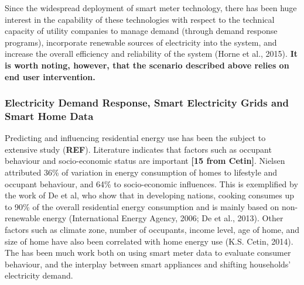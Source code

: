 \documentclass[11pt,]{article}
\begin{document}
Since the widespread deployment of smart meter technology, there has
been huge interest in the capability of these technologies with respect
to the technical capacity of utility companies to manage demand (through
demand response programs), incorporate renewable sources of electricity
into the system, and increase the overall efficiency and reliability of
the system (Horne et al., 2015). \textbf{It is worth noting, however,
that the scenario described above relies on end user intervention.}

\hypertarget{electricity-demand-response-smart-electricity-grids-and-smart-home-data}{%
\subsubsection{Electricity Demand Response, Smart Electricity Grids and
Smart Home
Data}\label{electricity-demand-response-smart-electricity-grids-and-smart-home-data}}

Predicting and influencing residential energy use has been the subject
to extensive study (\textbf{REF}). Literature indicates that factors
such as occupant behaviour and socio-economic status are important
\textbf{{[}15 from Cetin{]}}. Nielsen attributed 36\% of variation in
energy consumption of homes to lifestyle and occupant behaviour, and
64\% to socio-economic influences. This is exemplified by the work of De
et al, who show that in developing nations, cooking consumes up to 90\%
of the overall residential energy consumption and is mainly based on
non-renewable energy (International Energy Agency, 2006; De et al.,
2013). Other factors such as climate zone, number of occupants, income
level, age of home, and size of home have also been correlated with home
energy use (K.S. Cetin, 2014). The has been much work both on using
smart meter data to evaluate consumer behaviour, and the interplay
between smart appliances and shifting households' electricity demand.
\end{document}
